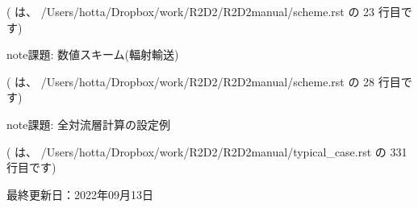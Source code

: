 \documentclass[letterpaper,10pt,dvipdfmx,report]{sphinxmanual}
\begin{document}
\sphinxAtStartPar
({\hyperref[\detokenize{scheme:id4}]{}} は、 /Users/hotta/Dropbox/work/R2D2/R2D2\sphinxhyphen{}manual/scheme.rst の 23 行目です)

\begin{sphinxadmonition}{note}{課題:}
\sphinxAtStartPar
数値スキーム(輻射輸送)
\end{sphinxadmonition}

\sphinxAtStartPar
({\hyperref[\detokenize{scheme:id6}]{}} は、 /Users/hotta/Dropbox/work/R2D2/R2D2\sphinxhyphen{}manual/scheme.rst の 28 行目です)

\begin{sphinxadmonition}{note}{課題:}
\sphinxAtStartPar
全対流層計算の設定例
\end{sphinxadmonition}

\sphinxAtStartPar
({\hyperref[\detokenize{typical_case:id10}]{}} は、 /Users/hotta/Dropbox/work/R2D2/R2D2\sphinxhyphen{}manual/typical\_case.rst の 331 行目です)

\sphinxAtStartPar
最終更新日：2022年09月13日


\renewcommand{\indexname}{Pythonモジュール索引}
\begin{sphinxtheindex}
\let\bigletter\sphinxstyleindexlettergroup
\bigletter{r}
\item\relax{}
\end{sphinxtheindex}

\renewcommand{\indexname}{索引}
\printindex
\end{document}
